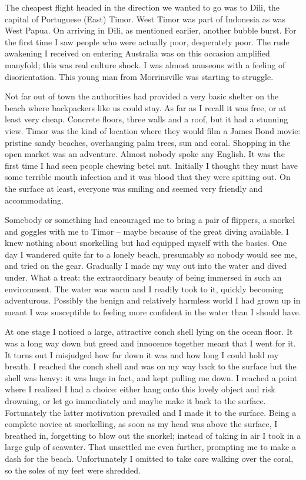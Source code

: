 The cheapest flight headed in the direction we wanted to go was to Dili,
the capital of Portuguese (East) Timor. West Timor was part of Indonesia
as was West Papua. On arriving in Dili, as mentioned earlier, another
bubble burst. For the first time I saw people who were actually poor,
desperately poor. The rude awakening I received on entering Australia
was on this occasion amplified manyfold; this was real culture shock. I
was almost nauseous with a feeling of disorientation. This young man
from Morrinsville was starting to struggle.

Not far out of town the authorities had provided a very basic shelter on
the beach where backpackers like us could stay. As far as I recall it
was free, or at least very cheap. Concrete floors, three walls and a
roof, but it had a stunning view. Timor was the kind of location where
they would film a James Bond movie: pristine sandy beaches, overhanging
palm trees, sun and coral. Shopping in the open market was an adventure.
Almost nobody spoke any English. It was the first time I had seen people
chewing betel nut. Initially I thought they must have some terrible
mouth infection and it was blood that they were spitting out. On the
surface at least, everyone was smiling and seemed very friendly and
accommodating.

Somebody or something had encouraged me to bring a pair of flippers, a
snorkel and goggles with me to Timor -- maybe because of the great
diving available. I knew nothing about snorkelling but had equipped
myself with the basics. One day I wandered quite far to a lonely beach,
presumably so nobody would see me, and tried on the gear. Gradually I
made my way out into the water and dived under. What a treat: the
extraordinary beauty of being immersed in such an environment. The water
was warm and I readily took to it, quickly becoming adventurous.
Possibly the benign and relatively harmless world I had grown up in
meant I was susceptible to feeling more confident in the water than I
should have.

At one stage I noticed a large, attractive conch shell lying on the
ocean floor. It was a long way down but greed and innocence together
meant that I went for it. It turns out I misjudged how far down it was
and how long I could hold my breath. I reached the conch shell and was
on my way back to the surface but the shell was heavy: it was huge in
fact, and kept pulling me down. I reached a point where I realized I had
a choice: either hang onto this lovely object and risk drowning, or let
go immediately and maybe make it back to the surface. Fortunately the
latter motivation prevailed and I made it to the surface. Being a
complete novice at snorkelling, as soon as my head was above the
surface, I breathed in, forgetting to blow out the snorkel; instead of
taking in air I took in a large gulp of seawater. That unsettled me even
further, prompting me to make a dash for the beach. Unfortunately I
omitted to take care walking over the coral, so the soles of my feet
were shredded.

